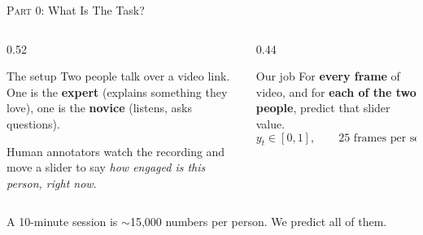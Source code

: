 \documentclass[aspectratio=169]{beamer}
\newcommand{\hl}[1]{\textcolor{coolpurple}{\textbf{#1}}}
\begin{document}

	\begin{frame}{\textsc{Part 0:} What Is The Task?}
		\begin{columns}[onlytextwidth]
			\begin{column}{0.52\textwidth}
				\begin{block}{The setup}
					\small
					Two people talk over a video link. One is the \hl{expert} (explains something
					they love), one is the \hl{novice} (listens, asks questions).
					\vspace{0.3em}

					Human annotators watch the recording and move a slider to say
					\emph{how engaged is this person, right now}.
				\end{block}
			\end{column}
			\begin{column}{0.44\textwidth}
				\begin{block}{Our job}
					\small
					For \textbf{every frame} of video, and for \textbf{each of the two people},
					predict that slider value.
					$$ y_t \in [0,1], \qquad 25 \text{ frames per second} $$
				\end{block}
			\end{column}
		\end{columns}
		\vspace{0.5em}
		\centering\small
		A 10-minute session is $\sim$15{,}000 numbers per person. We predict all of them.
	\end{frame}
\end{document}
